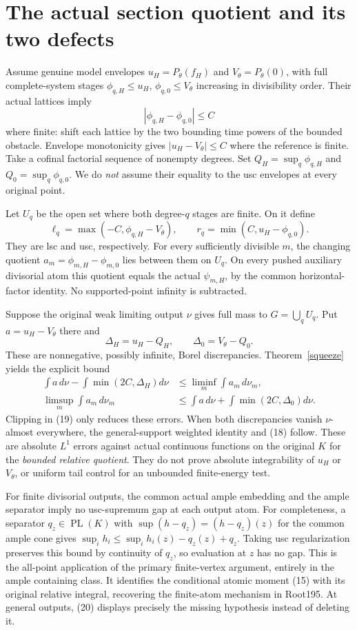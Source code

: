 \documentclass[10pt]{article}
\begin{document}
\section{The actual section quotient and its two defects}\label{defects}
Assume genuine model envelopes $u_H=P_\theta(f_H)$ and
$V_\theta=P_\theta(0)$, with full complete-system stages
$\phi_{q,H}\leq u_H$, $\phi_{q,0}\leq V_\theta$ increasing in
divisibility order. Their actual lattices imply
\[
 |\phi_{q,H}-\phi_{q,0}|\leq C
\]
where finite: shift each lattice by the two bounding time powers of
the bounded obstacle. Envelope monotonicity gives
$|u_H-V_\theta|\leq C$ where the reference is finite.
Take a cofinal factorial sequence of nonempty degrees.
Set $Q_H=\sup_q\phi_{q,H}$ and $Q_0=\sup_q\phi_{q,0}$.
We do \emph{not} assume their equality to the usc envelopes at
every original point.

Let $U_q$ be the open set where both degree-$q$ stages are finite.
On it define
\[
 \ell_q=\max(-C,\phi_{q,H}-V_\theta),\qquad
 r_q=\min(C,u_H-\phi_{q,0}).                                \tag{19}
\]
They are lsc and usc, respectively. For every sufficiently divisible
$m$, the changing quotient $a_m=\phi_{m,H}-\phi_{m,0}$
lies between them on $U_q$. On every pushed auxiliary divisorial atom
this quotient equals the actual $\psi_{m,H}$, by the common
horizontal-factor identity. No supported-point infinity is subtracted.

Suppose the original weak limiting output $\nu$ gives full mass to
$G=\bigcup_qU_q$. Put $a=u_H-V_\theta$ there and
\[
 \Delta_H=u_H-Q_H,\qquad\Delta_0=V_\theta-Q_0.
\]
These are nonnegative, possibly infinite, Borel discrepancies.
Theorem~\ref{squeeze} yields the explicit bound
\[
 \begin{split}
 \int a\,d\nu-\int\min(2C,\Delta_H)d\nu
 &\leq\liminf_m\int a_m\,d\nu_m,\\
 \limsup_m\int a_m\,d\nu_m
 &\leq\int a\,d\nu+\int\min(2C,\Delta_0)d\nu.
 \end{split}                                               \tag{20}
\]
Clipping in (19) only reduces these errors.
When both discrepancies vanish $\nu$-almost everywhere,
the general-support weighted identity and (18) follow.
These are absolute $L^1$ errors against actual continuous functions
on the original $K$ for the \emph{bounded relative quotient}.
They do not prove absolute integrability of $u_H$ or $V_\theta$,
or uniform tail control for an unbounded finite-energy test.

For finite divisorial outputs, the common actual ample embedding and
the ample separator imply no usc-supremum gap at each output atom.
For completeness, a separator $q_z\in\operatorname{PL}(K)$ with
$\sup(h-q_z)=(h-q_z)(z)$ for the common ample cone gives
$\sup_i h_i\leq\sup_i h_i(z)-q_z(z)+q_z$. Taking usc
regularization preserves this bound by continuity of $q_z$,
so evaluation at $z$ has no gap. This is the all-point application
of the primary finite-vertex argument, entirely in the ample
containing class. It identifies the conditional atomic moment (15)
with its original relative integral, recovering the finite-atom
mechanism in Root195. At general outputs, (20) displays precisely
the missing hypothesis instead of deleting it.
\end{document}
